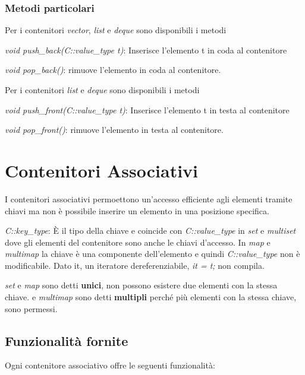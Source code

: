 \subsubsection{Metodi particolari}

Per i contenitori \textit{vector}, \textit{list} e \textit{deque} sono disponibili i metodi

\begin{description}
	\item \textit{void push\_back(C::value\_type t)}: Inserisce l'elemento t in coda al contenitore
	\item \textit{void pop\_back()}: rimuove l'elemento in coda al contenitore.
\end{description}

Per i contenitori \textit{list} e \textit{deque} sono disponibili i metodi

\begin{description}
	\item \textit{void push\_front(C::value\_type t)}: Inserisce l'elemento t in testa al contenitore
	\item \textit{void pop\_front()}: rimuove l'elemento in testa al contenitore.
\end{description}

\section{Contenitori Associativi}
I contenitori associativi permoettono un'accesso efficiente agli elementi tramite chiavi ma non è possibile inserire un elemento in una posizione specifica.

\textit{C::key\_type}: \`{E} il tipo della chiave e coincide con \textit{C::value\_type} in \textit{set} e \textit{multiset} dove gli elementi del contenitore sono anche le chiavi d'accesso. In \textit{map} e \textit{multimap} la chiave è una componente dell'elemento e quindi \textit{C::value\_type} non è modificabile. Dato it, un iteratore dereferenziabile, \textit{\textasteriskcentered it = t;} non compila.

\textit{set} e \textit{map} sono detti \textbf{unici}, non possono esistere due elementi con la stessa chiave.
 e \textit{multimap} sono detti \textbf{multipli} perché più elementi con la stessa chiave, sono permessi.

\subsection{Funzionalità fornite}
Ogni contenitore associativo offre le seguenti funzionalità:

